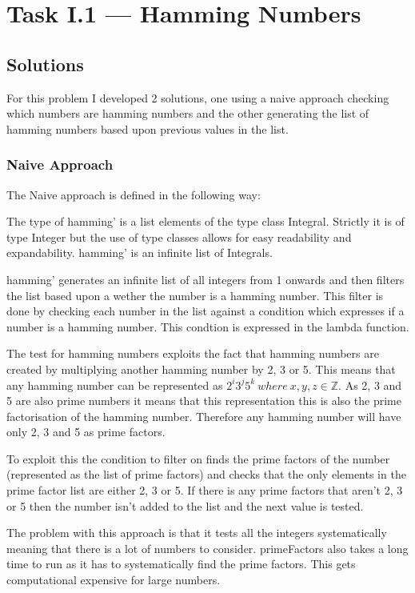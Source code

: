 \documentclass[a4paper]{article}
\begin{document}
\section{Task I.1 --- Hamming Numbers}
\subsection{Solutions}
For this problem I developed 2 solutions, one using a naive approach checking which numbers are hamming numbers and the other generating the list of hamming numbers based upon previous values in the list.
\subsubsection{Naive Approach}
The Naive approach is defined in the following way:

\par
The type of hamming' is a list elements of the type class Integral.
Strictly it is of type Integer but the use of type classes allows for easy readability and expandability.
hamming' is an infinite list of Integrals.
\par
hamming' generates an infinite list of all integers from 1 onwards and then filters the list based upon a wether the number is a hamming number.
This filter is done by checking each number in the list against a condition which expresses if a number is a hamming number.
This condtion is expressed in the lambda function.
\par
The test for hamming numbers exploits the fact that hamming numbers are created by multiplying another hamming number by 2, 3 or 5.
This means that any hamming number can be represented as \( 2^i3^j5^k\  where\ x,y,z \in \mathbb{Z} \).
As 2, 3 and 5 are also prime numbers it means that this representation this is also the prime factorisation of the hamming number.
Therefore any hamming number will have only 2, 3 and 5 as prime factors.
\par
To exploit this the condition to filter on finds the prime factors of the number (represented as the list of prime factors) and checks that the only elements in the prime factor list are either 2, 3 or 5.
If there is any prime factors that aren't 2, 3 or 5 then the number isn't added to the list and the next value is tested.
\medskip
\par
The problem with this approach is that it tests all the integers systematically meaning that there is a lot of numbers to consider.
primeFactors also takes a long time to run as it has to systematically find the prime factors.
This gets computational expensive for large numbers.
\end{document}
